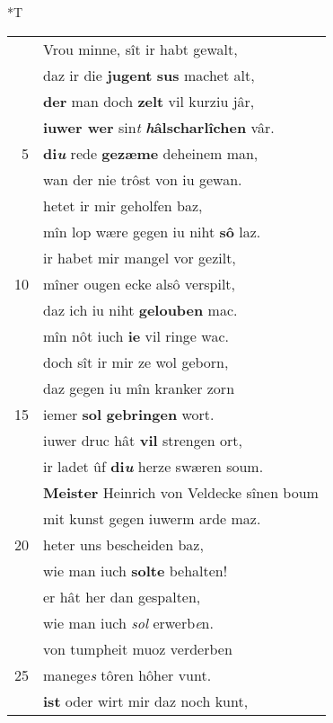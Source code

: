 \documentclass[8pt,a4paper,notitlepage]{article}
\begin{document}
\begin{table}[ht]
\begin{minipage}[t]{0.5\linewidth}
\end{minipage}
\hspace{0.5cm}
\begin{minipage}[t]{0.5\linewidth}
\small
\begin{center}*T
\end{center}
\begin{tabular}{rl}
 & Vrou minne, sît ir habt gewalt,\\ 
 & daz ir die \textbf{jugent} \textbf{sus} machet alt,\\ 
 & \textbf{der} man doch \textbf{zelt} vil kurziu jâr,\\ 
 & \textbf{iuwer wer} sin\textit{t} \textbf{\textit{h}âlscharlîchen} vâr.\\ 
5 & \textbf{di\textit{u}} rede \textbf{gezæme} deheinem man,\\ 
 & wan der nie trôst von iu gewan.\\ 
 & hetet ir mir geholfen baz,\\ 
 & mîn lop wære gegen iu niht \textbf{sô} laz.\\ 
 & ir habet mir mangel vor gezilt,\\ 
10 & mîner ougen ecke alsô verspilt,\\ 
 & daz ich iu niht \textbf{gelouben} mac.\\ 
 & mîn nôt iuch \textbf{ie} vil ringe wac.\\ 
 & doch sît ir mir ze wol geborn,\\ 
 & daz gegen iu mîn kranker zorn\\ 
15 & iemer \textbf{sol} \textbf{gebringen} wort.\\ 
 & iuwer druc hât \textbf{vil} strengen ort,\\ 
 & ir ladet ûf \textbf{di\textit{u}} herze swæren soum.\\ 
 & \textbf{Meister} Heinrich von Veldecke sînen boum\\ 
 & mit kunst gegen iuwerm arde maz.\\ 
20 & heter uns bescheiden baz,\\ 
 & wie man iuch \textbf{solte} behalten!\\ 
 & er hât her dan gespalten,\\ 
 & wie man iuch \textit{sol} erwerb\textit{e}n.\\ 
 & von tumpheit muoz verderben\\ 
25 & manege\textit{s} tôren hôher vunt.\\ 
 & \textbf{ist} oder wirt mir daz noch kunt,\\ 

\end{tabular}
\end{minipage}
\end{table}
\end{document}
